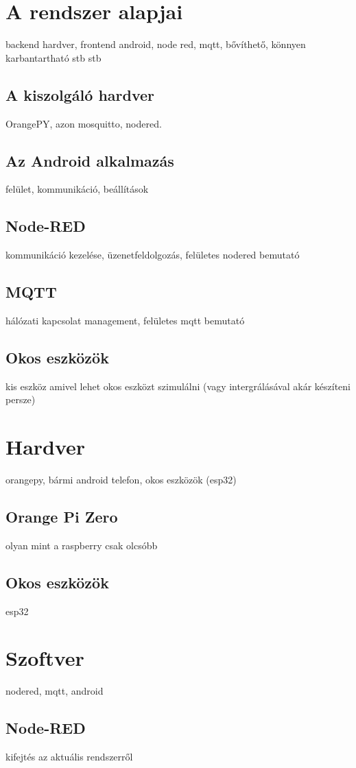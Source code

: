 \documentclass[
]{thesis-ekf}
\theoremstyle{definition}
\theoremstyle{remark}
\begin{document}
\chapter{A rendszer alapjai}
backend hardver, frontend android, node red, mqtt, bővíthető, könnyen karbantartható stb stb
\section{A kiszolgáló hardver}
OrangePY, azon mosquitto, nodered.
\section{Az Android alkalmazás}
felület, kommunikáció, beállítások
\section{Node-RED}
kommunikáció kezelése, üzenetfeldolgozás, felületes nodered bemutató
\section{MQTT}
hálózati kapcsolat management, felületes mqtt bemutató
\section{Okos eszközök}
kis eszköz amivel lehet okos eszközt szimulálni
(vagy intergrálásával akár készíteni persze)


\chapter{Hardver}
orangepy, bármi android telefon, okos eszközök (esp32)
\section{Orange Pi Zero}
olyan mint a raspberry csak olcsóbb
\section{Okos eszközök}
esp32

\chapter{Szoftver}
nodered, mqtt, android
\section{Node-RED}
kifejtés az aktuális rendszerről
\end{document}
